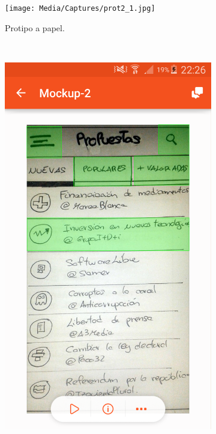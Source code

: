 \begin{enumerate}
	\begin{figure}[H]
        \centering
        \begin{subfigure}[b]{0.3\textwidth}
                \texttt{[image: Media/Captures/prot2\_1.jpg]}
                \caption{Protipo a papel.}
                \label{fig:quipDesktop}
        \end{subfigure}
        ~
        \begin{subfigure}[b]{0.3\textwidth}
                \includegraphics[width=\textwidth]{Media/Captures/prot2_2.png}

\end{subfigure}
\end{figure}
\end{enumerate}
